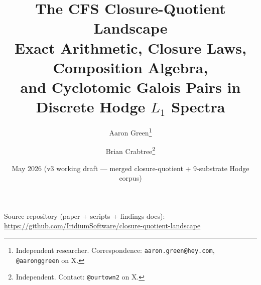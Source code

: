 \documentclass[12pt,a4paper]{article}
\theoremstyle{definition}
\theoremstyle{remark}
\begin{document}
\title{The CFS Closure-Quotient Landscape\\
\large Exact Arithmetic, Closure Laws, Composition Algebra,\\
and Cyclotomic Galois Pairs in Discrete Hodge $L_1$ Spectra}

\author{
  Aaron Green\thanks{Independent researcher. Correspondence: \texttt{aaron.green@hey.com}, \texttt{@aaronggreen} on X.}
  \and
  Brian Crabtree\thanks{Independent. Contact: \texttt{@ourtown2} on X.}
}

\date{May 2026 (v3 working draft --- merged closure-quotient + 9-substrate Hodge corpus)}

\maketitle

\begin{center}\small
Source repository (paper + scripts + findings docs):
\url{https://github.com/IridiumSoftware/closure-quotient-landscape}
\end{center}
\end{document}
